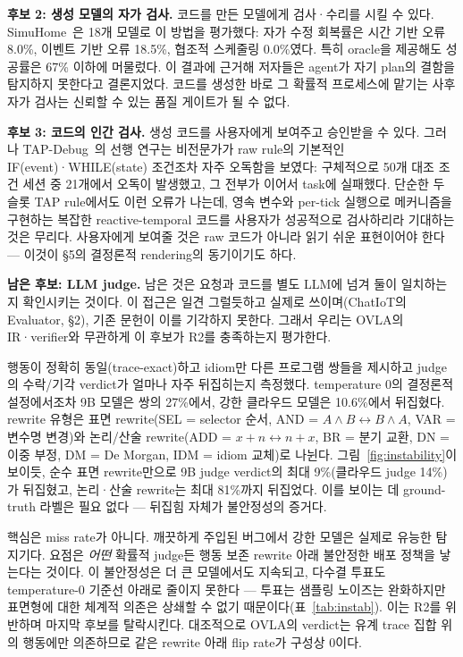 \documentclass[sigconf,nonacm,anonymous,review]{acmart}
\begin{document}
\textbf{후보 2: 생성 모델의 자가 검사.} 코드를 만든 모델에게 검사·수리를 시킬 수 있다. SimuHome~\cite{simuhome}은 18개 모델로 이 방법을 평가했다: 자가 수정 회복률은 시간 기반 오류 8.0\%, 이벤트 기반 오류 18.5\%, 협조적 스케줄링 0.0\%였다. 특히 oracle을 제공해도 성공률은 67\% 이하에 머물렀다. 이 결과에 근거해 저자들은 agent가 자기 plan의 결함을 탐지하지 못한다고 결론지었다. 코드를 생성한 바로 그 확률적 프로세스에 맡기는 사후 자가 검사는 신뢰할 수 있는 품질 게이트가 될 수 없다.

\textbf{후보 3: 코드의 인간 검사.} 생성 코드를 사용자에게 보여주고 승인받을 수 있다. 그러나 TAP-Debug~\cite{tapdebug}의 선행 연구는 비전문가가 raw rule의 기본적인 IF(event)·WHILE(state) 조건조차 자주 오독함을 보였다: 구체적으로 50개 대조 조건 세션 중 21개에서 오독이 발생했고, 그 전부가 이어서 task에 실패했다. 단순한 두 슬롯 TAP rule에서도 이런 오류가 나는데, 영속 변수와 per-tick 실행으로 메커니즘을 구현하는 복잡한 reactive-temporal 코드를 사용자가 성공적으로 검사하리라 기대하는 것은 무리다. 사용자에게 보여줄 것은 raw 코드가 아니라 읽기 쉬운 표현이어야 한다 — 이것이 \S5의 결정론적 rendering의 동기이기도 하다.

\textbf{남은 후보: LLM judge.} 남은 것은 요청과 코드를 별도 LLM에 넘겨 둘이 일치하는지 확인시키는 것이다. 이 접근은 일견 그럴듯하고 실제로 쓰이며(ChatIoT의 Evaluator, \S2), 기존 문헌이 이를 기각하지 못한다. 그래서 우리는 OVLA의 IR·verifier와 무관하게 이 후보가 R2를 충족하는지 평가한다.

행동이 정확히 동일(trace-exact)하고 idiom만 다른 프로그램 쌍들을 제시하고 judge의 수락/기각 verdict가 얼마나 자주 뒤집히는지 측정했다. temperature 0의 결정론적 설정에서조차 9B 모델은 쌍의 27\%에서, 강한 클라우드 모델은 10.6\%에서 뒤집혔다. rewrite 유형은 표면 rewrite(SEL = selector 순서, AND = $A{\wedge}B{\leftrightarrow}B{\wedge}A$, VAR = 변수명 변경)와 논리/산술 rewrite(ADD = $x{+}n{\leftrightarrow}n{+}x$, BR = 분기 교환, DN = 이중 부정, DM = De Morgan, IDM = idiom 교체)로 나뉜다. 그림~\ref{fig:instability}이 보이듯, 순수 표면 rewrite만으로 9B judge verdict의 최대 9\%(클라우드 judge 14\%)가 뒤집혔고, 논리·산술 rewrite는 최대 81\%까지 뒤집었다. 이를 보이는 데 ground-truth 라벨은 필요 없다 — 뒤집힘 자체가 불안정성의 증거다.

핵심은 miss rate가 아니다. 깨끗하게 주입된 버그에서 강한 모델은 실제로 유능한 탐지기다. 요점은 \emph{어떤} 확률적 judge든 행동 보존 rewrite 아래 불안정한 배포 정책을 낳는다는 것이다. 이 불안정성은 더 큰 모델에서도 지속되고, 다수결 투표도 temperature-0 기준선 아래로 줄이지 못한다 — 투표는 샘플링 노이즈는 완화하지만 표면형에 대한 체계적 의존은 상쇄할 수 없기 때문이다(표~\ref{tab:instab}). 이는 R2를 위반하며 마지막 후보를 탈락시킨다. 대조적으로 OVLA의 verdict는 유계 trace 집합 위의 행동에만 의존하므로 같은 rewrite 아래 flip rate가 구성상 0이다.
\end{document}
